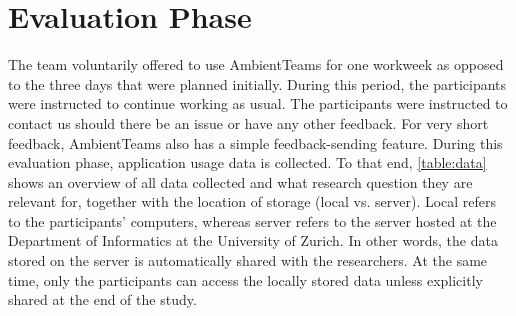\section{Evaluation Phase}
\label{section:evaluation}
The team voluntarily offered to use AmbientTeams for one workweek as opposed to the three days that were planned initially. During this period, the participants were instructed to continue working as usual. The participants were instructed to contact us should there be an issue or have any other feedback. For very short feedback, AmbientTeams also has a simple feedback-sending feature. During this evaluation phase, application usage data is collected. To that end, \autoref{table:data} shows an overview of all data collected and what research question they are relevant for, together with the location of storage (local vs. server). Local refers to the participants' computers, whereas server refers to the server hosted at the Department of Informatics at the University of Zurich. In other words, the data stored on the server is automatically shared with the researchers. At the same time, only the participants can access the locally stored data unless explicitly shared at the end of the study.

